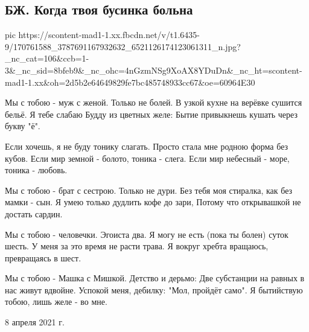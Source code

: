  
 
 
 
 
\subsection{БЖ. Когда твоя бусинка больна}


\ifcmt
  pic https://scontent-mad1-1.xx.fbcdn.net/v/t1.6435-9/170761588_3787691167932632_6521126174123061311_n.jpg?_nc_cat=106&ccb=1-3&_nc_sid=8bfeb9&_nc_ohc=4nGzmNSg9XoAX8YDuDn&_nc_ht=scontent-mad1-1.xx&oh=2d5b2e64649829fe7bc485748933cc67&oe=60964E30
\fi


Мы с тобою - муж с женой. Только не болей.
В узкой кухне на верёвке сушится бельё.
Я тебе слабаю Будду из цветных желе:
Бытие привыкнешь кушать через букву "ё".

Если хочешь, я не буду тонику слагать.
Просто стала мне родною форма без кубов.
Если мир земной - болото, тоника - слега.
Если мир небесный - море, тоника - любовь.

Мы с тобою - брат с сестрою. Только не дури.
Без тебя моя стиралка, как без мамки - сын.
Я умею только дудлить кофе до зари,
Потому что открывашкой не достать сардин.

Мы с тобою - человечки. Эгоиста два.
Я могу не есть (пока ты болен) суток шесть.
У меня за это время не расти трава.
Я вокруг хребта вращаюсь, превращаясь в шест.

Мы с тобою - Машка с Мишкой. Детство и дерьмо:
Две субстанции на равных в нас живут вдвойне.
Успокой меня, дебилку: "Мол, пройдёт само".
Я бытийствую тобою, лишь желе - во мне. 

8 апреля 2021 г.
